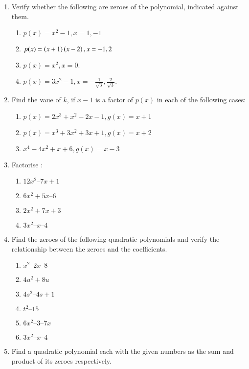 \renewcommand{\theequation}{\theenumi}
\begin{enumerate}[label=\arabic*.,ref=\thesubsection.\theenumi]
\item Verify whether the following are zeroes of the polynomial, indicated against them. 
\begin{enumerate}

\item $ p(x) = x^2-1, x = 1, -1$
\item $ p(x) = \left(x+1\right) \left(x-2\right), x = -1,2$
\item $ p(x) = x^2, x = 0$.
\item $ p(x) = 3x^2-1, x = -\frac{1}{\sqrt{3}}, \frac{2}{\sqrt{3}}$.
\end{enumerate}
\item Find the vaue of $k$, if $x-1$ is a factor of $p(x)$ in each of the following cases:
\begin{enumerate}
\item $p(x) = 2x^3+x^2-2x-1, g(x) = x+1$
\item $p(x) = x^3+3x^2+3x+1, g(x) = x+2$
\item $x^4-4x^2+x+6, g(x) = x-3$
\end{enumerate}
%
\item  Factorise : 
\begin{enumerate}
\item $12x^2 – 7x + 1 $
\item $6x^2+ 5x – 6$
\item $2x^2+ 7x + 3 $
\item $3x^2– x – 4$
\end{enumerate}
\item Find the zeroes of the following quadratic polynomials and verify the relationship between the zeroes and the coefficients.
\begin{enumerate}
\item $x^2 – 2x – 8$
\item  $4u^2 + 8u$
\item $4s^2 – 4s + 1$
\item $t^2 – 15$
\item $6x^2– 3 – 7x $
\item $3x^2 – x – 4$
\end{enumerate}
\item  Find a quadratic polynomial each with the given numbers as the sum and product of its zeroes respectively.
\begin{enumerate}

\end{enumerate}
\end{enumerate}
